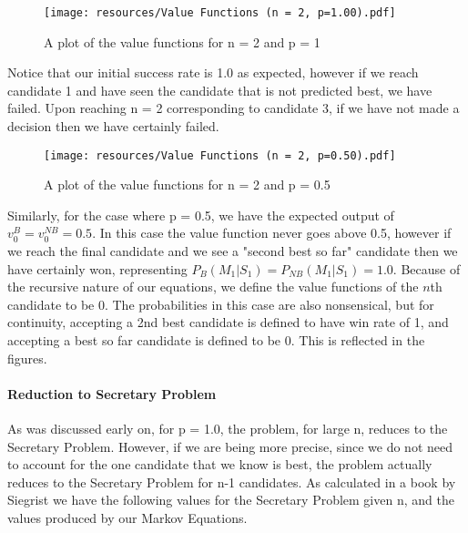 \documentclass[a4paper,11pt]{article}
\begin{document}
\begin{figure}[H]
    \centering
    \texttt{[image: resources/Value Functions (n = 2, p=1.00).pdf]}
    \caption{A plot of the value functions for n = 2 and p = 1}
    \label{fig:n=2p=1}
\end{figure}

Notice that our initial success rate is 1.0 as expected, however if we reach candidate 1 and have seen the candidate that is not predicted best, we have failed. Upon reaching n = 2 corresponding to candidate 3, if we have not made a decision then we have certainly failed.

\begin{figure}[H]
    \centering
    \texttt{[image: resources/Value Functions (n = 2, p=0.50).pdf]}
    \caption{A plot of the value functions for n = 2 and p = 0.5}
    \label{fig:n=2p=0.5}
\end{figure}

Similarly, for the case where p = 0.5, we have the expected output of $v^B_0 = v^{NB}_0=0.5$. In this case the value function never goes above 0.5, however if we reach the final candidate and we see a "second best so far" candidate then we have certainly won, representing $P_B(M_1|S_1) = P_{NB}(M_1|S_1) = 1.0$. Because of the recursive nature of our equations, we define the value functions of the $n$th candidate to be 0. The probabilities in this case are also nonsensical, but for continuity, accepting a 2nd best candidate is defined to have win rate of 1, and accepting a best so far candidate is defined to be 0. This is reflected in the figures.

\paragraph{Reduction to Secretary Problem}

As was discussed early on, for p = 1.0, the problem, for large n, reduces to the Secretary Problem. However, if we are being more precise, since we do not need to account for the one candidate that we know is best, the problem actually reduces to the Secretary Problem for n-1 candidates. As calculated in a book by Siegrist \cite{Libretexts_2022} we have the following values for the Secretary Problem given n, and the values produced by our Markov Equations.
\end{document}
